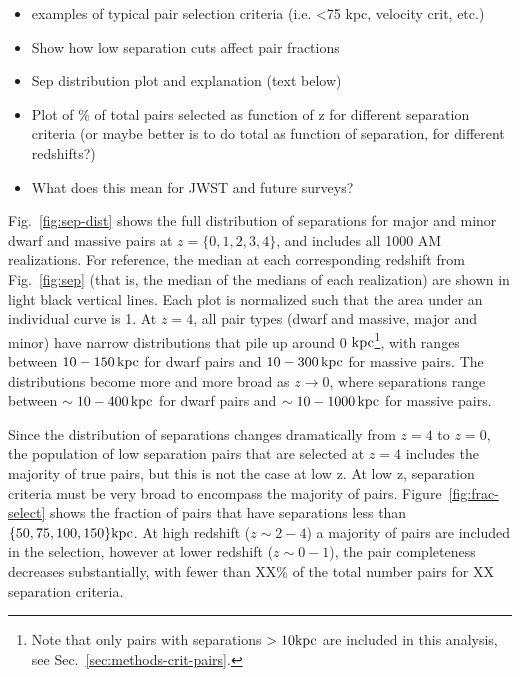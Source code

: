\documentclass[twocolumn]{aastex631}
\begin{document}
    \begin{itemize}
        \item examples of typical pair selection criteria (i.e. <75 kpc, velocity crit, etc.)
        \item Show how low separation cuts affect pair fractions      
        \item Sep distribution plot and explanation (text below) 
        \item Plot of \% of total pairs selected as function of z for different separation criteria (or maybe better is to do total as function of separation, for different redshifts?) 
        \item What does this mean for JWST and future surveys?
    \end{itemize}
    
    
Fig.~\ref{fig:sep-dist} shows the full distribution of separations for major and minor dwarf and massive pairs at $z=\{0,1,2,3,4\}$, and includes all 1000 AM realizations. 
For reference, the median at each corresponding redshift from Fig.~\ref{fig:sep} (that is, the median of the medians of each realization) are shown in light black vertical lines.
Each plot is normalized such that the area under an individual curve is 1.
At $z=4$, all pair types (dwarf and massive, major and minor) have narrow distributions that pile up around 0 $\mathrm{kpc}$\footnote{Note that only pairs with separations $>10\mathrm{kpc}$ are included in this analysis, see Sec.~\ref{sec:methods-crit-pairs}.}, with ranges between $10-150\,\mathrm{kpc}$ for dwarf pairs and $10-300\,\mathrm{kpc}$ for massive pairs. 
The distributions become more and more broad as $z\to0$, where separations range between $\sim10-400\,\mathrm{kpc}$ for dwarf pairs and $\sim10-1000\,\mathrm{kpc}$ for massive pairs.

Since the distribution of separations changes dramatically from $z=4$ to $z=0$, the population of low separation pairs that are selected at $z=4$ includes the majority of true pairs, but this is not the case at low z. 
At low z, separation criteria must be very broad to encompass the majority of pairs. 
Figure~\ref{fig:frac-select} shows the fraction of pairs that have separations less than $\{50, 75, 100, 150\}\mathrm{kpc}$.
At high redshift ($z\sim2-4$) a majority of pairs are included in the selection, however at lower redshift ($z\sim0-1$), the pair completeness decreases substantially, with fewer than XX\% of the total number pairs for XX separation criteria. 
\end{document}
